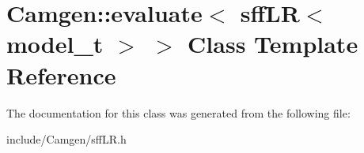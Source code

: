 \hypertarget{a00193}{}\section{Camgen\+:\+:evaluate$<$ sff\+L\+R$<$ model\+\_\+t $>$ $>$ Class Template Reference}
\label{a00193}


The documentation for this class was generated from the following file\+:\begin{DoxyCompactItemize}
\item 
include/\+Camgen/sff\+L\+R.\+h\end{DoxyCompactItemize}

